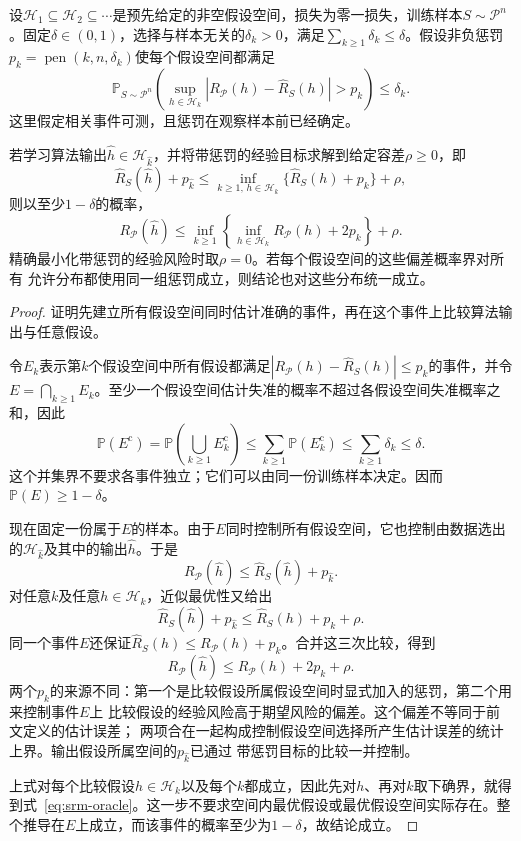 \begin{theorem}[结构风险最小化的期望风险保证]
\label{thm:srm-oracle-bound}
设$\mathcal H_1\subseteq\mathcal H_2\subseteq\cdots$是预先给定的非空假设空间，损失为零一损失，训练样本$S\sim\mathcal P^n$。固定$\delta\in(0,1)$，选择与样本无关的$\delta_k>0$，满足$\sum_{k\geq1}\delta_k\leq\delta$。假设非负惩罚$p_k=\operatorname{pen}(k,n,\delta_k)$使每个假设空间都满足
\begin{equation}
 \mathbb P_{S\sim\mathcal P^n}\left(
 \sup_{h\in\mathcal H_k}
 |R_{\mathcal P}(h)-\hat R_S(h)|>p_k
 \right)\leq\delta_k.
 \label{eq:srm-classwise-confidence}
\end{equation}
这里假定相关事件可测，且惩罚在观察样本前已经确定。

若学习算法输出$\hat h\in\mathcal H_{\hat k}$，并将带惩罚的经验目标求解到给定容差$\rho\geq0$，即
\begin{equation}
 \hat R_S(\hat h)+p_{\hat k}
 \leq\inf_{k\geq1,\,h\in\mathcal H_k}
       \{\hat R_S(h)+p_k\}+\rho,
 \label{eq:srm-approximate-minimizer}
\end{equation}
则以至少$1-\delta$的概率，
\begin{equation}
 R_{\mathcal P}(\hat h)
 \leq\inf_{k\geq1}\left\{
       \inf_{h\in\mathcal H_k}R_{\mathcal P}(h)+2p_k
       \right\}+\rho.
 \label{eq:srm-oracle}
\end{equation}
精确最小化带惩罚的经验风险时取$\rho=0$。若每个假设空间的这些偏差概率界对所有
允许分布都使用同一组惩罚成立，则结论也对这些分布统一成立。
\end{theorem}

\begin{proof}
证明先建立所有假设空间同时估计准确的事件，再在这个事件上比较算法输出与任意假设。

令$E_k$表示第$k$个假设空间中所有假设都满足$|R_{\mathcal P}(h)-\hat R_S(h)|\leq p_k$的事件，并令$E=\bigcap_{k\geq1}E_k$。至少一个假设空间估计失准的概率不超过各假设空间失准概率之和，因此
\[
 \mathbb P(E^{\mathrm c})
 =\mathbb P\left(\bigcup_{k\geq1}E_k^{\mathrm c}\right)
 \leq\sum_{k\geq1}\mathbb P(E_k^{\mathrm c})
 \leq\sum_{k\geq1}\delta_k\leq\delta.
\]
这个并集界不要求各事件独立；它们可以由同一份训练样本决定。因而$\mathbb P(E)\geq1-\delta$。

现在固定一份属于$E$的样本。由于$E$同时控制所有假设空间，它也控制由数据选出的$\mathcal H_{\hat k}$及其中的输出$\hat h$。于是
\[
 R_{\mathcal P}(\hat h)\leq\hat R_S(\hat h)+p_{\hat k}.
\]
对任意$k$及任意$h\in\mathcal H_k$，近似最优性又给出
\[
 \hat R_S(\hat h)+p_{\hat k}
 \leq\hat R_S(h)+p_k+\rho.
\]
同一个事件$E$还保证$\hat R_S(h)\leq R_{\mathcal P}(h)+p_k$。合并这三次比较，得到
\[
 R_{\mathcal P}(\hat h)
 \leq R_{\mathcal P}(h)+2p_k+\rho.
\]
两个$p_k$的来源不同：第一个是比较假设所属假设空间时显式加入的惩罚，第二个用来控制事件$E$上
比较假设的经验风险高于期望风险的偏差。这个偏差不等同于前文定义的估计误差；
两项合在一起构成控制假设空间选择所产生估计误差的统计上界。输出假设所属空间的$p_{\hat k}$已通过
带惩罚目标的比较一并控制。

上式对每个比较假设$h\in\mathcal H_k$以及每个$k$都成立，因此先对$h$、再对$k$取下确界，就得到式~\eqref{eq:srm-oracle}。这一步不要求空间内最优假设或最优假设空间实际存在。整个推导在$E$上成立，而该事件的概率至少为$1-\delta$，故结论成立。
\end{proof}

